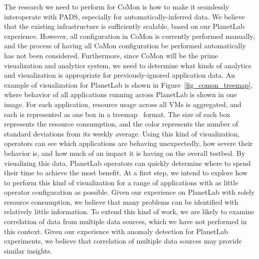 The research we need to perform for CoMon is how to make it seamlessly
interoperate with PADS, especially for automatically-inferred data. We
believe that the existing infrastructure is sufficiently scalable,
based on our PlanetLab experience. However, all configuration in CoMon
is currently performed manually, and the process of having all CoMon
configuration be performed automatically has not been
considered. Furthermore, since CoMon will be the prime visualization
and analytics system, we need to determine what kinds of analytics and
visualization is appropriate for previously-ignored application data.
An example of visualization for PlanetLab is shown in
Figure~\ref{fig_comon_treemap}, where behavior of all applications
running across PlanetLab is shown in one image. For each application,
resource usage across all VMs is aggregated, and each is represented
as one box in a treemap~\cite{x} format. The size of each box
represents the resource consumption, and the color represents the
number of standard deviations from its weekly average. Using this kind
of visualization, operators can see which applications are behaving
unexpectedly, how severe their behavior is, and how much of an impact
it is having on the overall testbed. By visualizing this data,
PlanetLab operators can quickly determine where to spend their time to
achieve the most benefit.  At a first step, we intend to explore how
to perform this kind of visualization for a range of applications with
as little operator configuration as possible.  Given our experience on
PlanetLab with solely resource consumption, we believe that many
problems can be identified with relatively little information. To
extend this kind of work, we are likely to examine correlation of data
from multiple data sources, which we have not performed in this
context.  Given our experience with anomaly detection for PlanetLab
experiments, we believe that correlation of multiple data sources may
provide similar insights.
